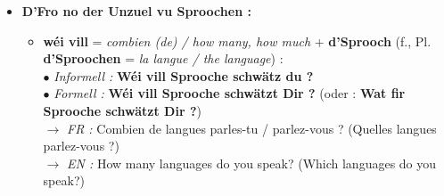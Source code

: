 \begin{itemize}
    \item \textbf{D'Fro no der Unzuel vu Sproochen :}
    \begin{itemize}
        \item \textbf{wéi vill} = \textit{combien (de) / how many, how much} + \textbf{d'Sprooch} (f., Pl. \textbf{d'Sproochen} = \textit{la langue / the language}) : \\
        $\bullet$ \textit{Informell :} \textbf{Wéi vill Sprooche schwätz du ?} \\
        $\bullet$ \textit{Formell :} \textbf{Wéi vill Sprooche schwätzt Dir ?} (oder : \textbf{Wat fir Sprooche schwätzt Dir ?}) \\
        $\rightarrow$ \textit{FR :} Combien de langues parles-tu / parlez-vous ? (Quelles langues parlez-vous ?) \\
        $\rightarrow$ \textit{EN :} How many languages do you speak? (Which languages do you speak?)
    \end{itemize}

    \vspace{0.3em}


\end{itemize}
